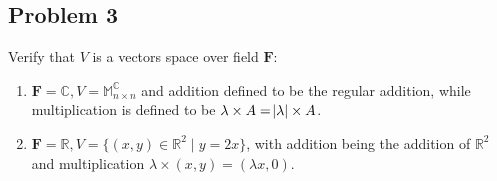 \documentclass[11pt]{article}
\begin{document}
\subsection{Problem 3}
\label{sec-1-3}
Verify that $V$ is a vectors space over field $\textbf{F}$:
\begin{enumerate}
\item $\textbf{F} = \mathbb{C}, V = \mathbb{M}_{n\times n}^{\mathbb{C}}$ and
addition defined to be the regular addition, while multiplication is
defined to be $\lambda\times A = \abs{\lambda}\times A$.
\item $\textbf{F} = \mathbb{R}, V = \{(x,y) \in \mathbb{R}^2\;|\;y=2x\}$,
with addition being the addition of $\mathbb{R}^2$ and multiplication
$\lambda\times (x,y) = (\lambda x, 0)$.
\end{enumerate}
\end{document}
